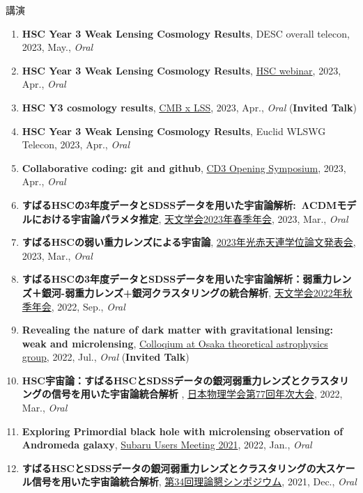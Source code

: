 \begin{rSection}{講演}
\begin{enumerate}
\item \textbf{HSC Year 3 Weak Lensing Cosmology Results}, DESC overall telecon, 2023, May., \textit{Oral}
\item \textbf{HSC Year 3 Weak Lensing Cosmology Results}, \href{https://hsc-release.mtk.nao.ac.jp/doc/index.php/wly3/}{HSC webinar}, 2023, Apr., \textit{Oral}
\item \textbf{HSC Y3 cosmology results}, \href{https://www2.yukawa.kyoto-u.ac.jp/~cmb-lss/index.php}{CMB x LSS}, 2023, Apr., \textit{Oral} (\textbf{Invited Talk})
\item \textbf{HSC Year 3 Weak Lensing Cosmology Results}, Euclid WLSWG Telecon, 2023, Apr., \textit{Oral}
\item \textbf{Collaborative coding: git and github}, \href{https://cd3.ipmu.jp/opening/}{CD3 Opening Symposium}, 2023, Apr., \textit{Oral}
\item \textbf{すばるHSCの3年度データとSDSSデータを用いた宇宙論解析: ΛCDMモデルにおける宇宙論パラメタ推定}, \href{https://www.asj.or.jp/nenkai/archive/2023a/pdf/U20a.pdf}{天文学会2023年春季年会}, 2023, Mar., \textit{Oral}
\item \textbf{すばるHSCの弱い重力レンズによる宇宙論}, \href{http://gopira.jp/Dthesis2022/program.html}{2023年光赤天連学位論文発表会}, 2023, Mar., \textit{Oral}
\item \textbf{すばるHSCの3年度データとSDSSデータを用いた宇宙論解析：弱重力レンズ＋銀河-弱重力レンズ+銀河クラスタリングの統合解析}, \href{https://www.asj.or.jp/nenkai/archive/2022b/pdf/U15a.pdf}{天文学会2022年秋季年会}, 2022, Sep., \textit{Oral}
\item \textbf{Revealing the nature of dark matter with gravitational lensing: weak and microlensing}, \href{http://astro-osaka.jp/OUTAP/colloquium-abstracts.html#sugiyama}{Colloqium at Osaka theoretical astrophysics group}, 2022, Jul., \textit{Oral} (\textbf{Invited Talk})
\item \textbf{HSC宇宙論：すばるHSCとSDSSデータの銀河弱重力レンズとクラスタリングの信号を用いた宇宙論統合解析 }, \href{https://www.jps.or.jp/activities/meetings/annual/annual-index.php}{日本物理学会第77回年次大会}, 2022, Mar., \textit{Oral}
\item \textbf{Exploring Primordial black hole with microlensing observation of Andromeda galaxy}, \href{https://subarutelescope.org/Science/SubaruUM/SubaruUM2021/}{Subaru Users Meeting 2021}, 2022, Jan., \textit{Oral}
\item \textbf{すばるHSCとSDSSデータの銀河弱重力レンズとクラスタリングの大スケール信号を用いた宇宙論統合解析}, \href{https://sites.google.com/view/rironkon2021/}{第34回理論懇シンポジウム}, 2021, Dec., \textit{Oral}

\end{enumerate}
\end{rSection}
